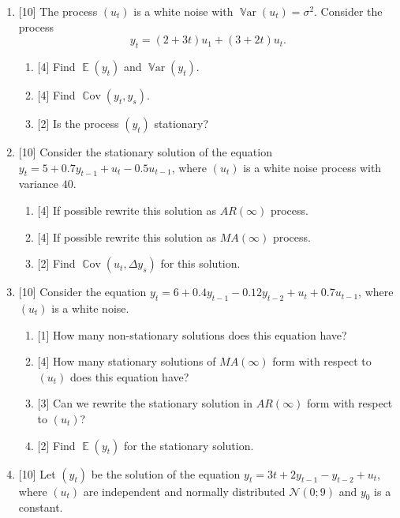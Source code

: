 \documentclass[12pt]{article}
\DeclareMathOperator{\Cov}{\mathbb{C}ov}
\DeclareMathOperator{\Var}{\mathbb{V}ar}
\DeclareMathOperator{\E}{\mathbb{E}}
\newcommand{\cN}{\mathcal{N}}
\begin{document}
\begin{enumerate}
    \item {[10]} The process $(u_t)$ is a white noise with $\Var(u_t) = \sigma^2$.
    Consider the process 
    \[
    y_t = (2 + 3t) u_1 + (3 + 2t) u_t.
    \]
    \begin{enumerate}
        \item {[4]} Find $\E(y_t)$ and $\Var(y_t)$.
        \item {[4]} Find $\Cov(y_t, y_s)$.
        \item {[2]} Is the process $(y_t)$ stationary?
    \end{enumerate}

    \item {[10]} Consider the stationary solution of the equation 
    $y_t = 5 + 0.7 y_{t-1} + u_t - 0.5 u_{t-1}$,    
    where $(u_t)$ is a white noise process with variance $40$. 
    \begin{enumerate}
        \item {[4]} If possible rewrite this solution as $AR(\infty)$ process. 
        \item {[4]} If possible rewrite this solution as $MA(\infty)$ process. 
        \item {[2]} Find $\Cov(u_t, \Delta y_s)$ for this solution. 
    \end{enumerate}
    
    \item {[10]} Consider the equation 
    $y_t = 6 + 0.4 y_{t-1} - 0.12 y_{t-2} + u_t + 0.7u_{t-1}$,
    where $(u_t)$ is a white noise. 

    \begin{enumerate}
        \item {[1]} How many non-stationary solutions does this equation have?
        \item {[4]} How many stationary solutions of $MA(\infty)$ form with respect to $(u_t)$ does this equation have?
        \item {[3]} Can we rewrite the stationary solution in $AR(\infty)$ form with respect to $(u_t)$?
        \item {[2]} Find $\E(y_t)$ for the stationary solution.
    \end{enumerate}


    \item {[10]} Let $(y_t)$ be the solution of the equation 
    $y_t = 3t + 2 y_{t-1} - y_{t-2} + u_t$,
    where $(u_t)$ are independent and normally distributed $\cN(0;9)$ and $y_0$ is a constant.


\end{enumerate}
\end{document}
